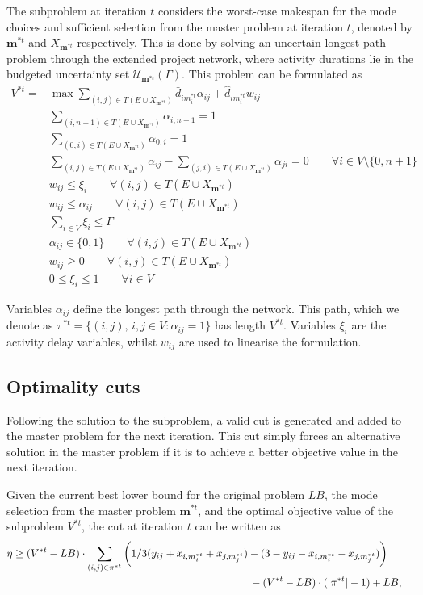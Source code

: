 \documentclass[a4paper,abstracton]{scrartcl}
\newcommand{\U}{{\mathcal{U}}}
\begin{document}
The subproblem at iteration $t$ considers the worst-case makespan for the mode choices and sufficient selection from the master problem at iteration $t$, denoted by $\bm{m}^{*t}$ and $X_{\bm{m}^{*t}}$ respectively. This is done by solving an uncertain longest-path problem through the extended project network, where activity durations lie in the budgeted uncertainty set $\U_{\bm{m}^{*t}}(\Gamma)$. This problem can be formulated as 
\begin{align}
V^{*t} = &\max \sum_{(i,j)\in T(E\cup X_{\bm{m}^{*t}})} \bar{d}_{im^{*t}_i}\alpha_{ij} + \hat{d}_{im^{*t}_i}w_{ij}\\
	& \sum_{(i,n+1)\in T(E\cup X_{\bm{m}^{*t}})} \alpha_{i,n+1} = 1\\
	& \sum_{(0,i)\in T(E\cup X_{\bm{m}^{*t}})} \alpha_{0,i} = 1\\
	& \sum_{(i,j)\in T(E\cup X_{\bm{m}^{*t}})} \alpha_{ij} - \sum_{(j,i)\in T(E\cup X_{\bm{m}^{*t}})} \alpha_{ji} = 0 \qquad \forall i \in V\setminus\{0,n+1\}\\
	& w_{ij} \leq \xi_i \qquad \forall (i,j)\in T(E\cup X_{\bm{m}^{*t}})\\
	& w_{ij} \leq \alpha_{ij} \qquad \forall (i,j)\in T(E\cup X_{\bm{m}^{*t}})\\
	& \sum_{i\in V}\xi_i \leq \Gamma\\
	& \alpha_{ij}\in \{0,1\} \qquad \forall (i,j)\in T(E\cup X_{\bm{m}^{*t}})\\
	& w_{ij}\geq 0 \qquad \forall (i,j)\in T(E\cup X_{\bm{m}^{*t}})\\
	& 0\leq \xi_i \leq 1 \qquad \forall i\in V
\end{align}

Variables $\alpha_{ij}$ define the longest path through the network. This path, which we denote as $\pi^{*t}=\{(i,j),\,i,j\in V:\alpha_{ij}=1\}$ has length $V^{*t}$. Variables $\xi_i$ are the activity delay variables, whilst $w_{ij}$ are used to linearise the formulation.

\subsection{Optimality cuts} \label{section:optimality_cuts}

Following the solution to the subproblem, a valid cut is generated and added to the master problem for the next iteration. This cut simply forces an alternative solution in the master problem if it is to achieve a better objective value in the next iteration. 

Given the current best lower bound for the original problem $LB$, the mode selection from the master problem $\bm{m}^{*t}$, and the optimal objective value of the subproblem $V^{*t}$, the cut at iteration $t$ can be written as
\begin{align}
	& \eta \geq (V^{*t} - LB)\cdot\sum_{(i,j)\in \pi^{*t}}\bigg(1/3 (y_{ij} + x_{i,m_i^{*t}} + x_{j,m_j^{*t}}) - (3 - y_{ij} - x_{i,m_i^{*t}} - x_{j,m_j^{*t}})\bigg) & \nonumber \\
	& \hspace{8.1cm} - (V^{*t} - LB)\cdot(|\pi^{*t}|-1) + LB,\label{eqn:benders_cut}
\end{align}
\end{document}
